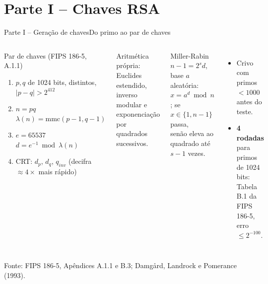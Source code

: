\documentclass[10pt,aspectratio=169]{beamer}
\newcommand{\source}[1]{\vfill{\tiny\color{gray}Fonte: #1}}
\begin{document}
\section{Parte I -- Chaves RSA}
\begin{frame}{Parte I -- Geração de chaves}{Do primo ao par de chaves}
  \begin{columns}[T,onlytextwidth]
      \begin{block}{Par de chaves (FIPS 186-5, A.1.1)}
        \begin{enumerate}
          \item $p, q$ de 1024 bits, distintos, $|p-q| > 2^{412}$
          \item $n = pq$ \quad $\lambda(n) = \mathrm{mmc}(p-1, q-1)$
          \item $e = 65537$ \quad $d = e^{-1} \bmod \lambda(n)$
          \item CRT: $d_p$, $d_q$, $q_{inv}$ (decifra $\approx 4\times$ mais rápido)
        \end{enumerate}
      \end{block}
      \small Aritmética própria: Euclides estendido, inverso modular e exponenciação por quadrados sucessivos.
      \begin{block}{Miller-Rabin}
        $n - 1 = 2^s d$, base $a$ aleatória:\\[3pt]
        $x = a^d \bmod n$; se $x \in \{1, n-1\}$ passa,\\
        senão eleva ao quadrado até $s-1$ vezes.
      \end{block}
      \begin{itemize}
        \item Crivo com primos $< 1000$ antes do teste.
        \item \textbf{4 rodadas} para primos de 1024 bits: Tabela B.1 da FIPS 186-5, erro $\le 2^{-100}$.
      \end{itemize}
  \end{columns}
  \source{FIPS 186-5, Apêndices A.1.1 e B.3; Damgård, Landrock e Pomerance (1993).}
\end{frame}
\end{document}
